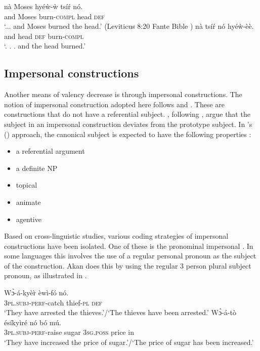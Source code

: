 \documentclass[output=paper]{langsci/langscibook}
\begin{document}
\ea\label{ex:34.osam}
\ea\label{ex:34a.osam}
\gll nà  Moses    hyéẁ-ẁ   tsíŕ  nó.\\
       and   Moses     burn-\textsc{compl}  head  \textsc{def}\\
\glt `...  and Moses burned the head.' (Leviticus 8:20 Fante Bible \citep{bible1974})
\ex\label{ex:34b.osam}
\gll  nà  tsíŕ   nó  hyéẁ-èè.\\
       and  head  \textsc{def}  burn-\textsc{compl}  \\
\glt `. .  . and the head burned.'
\z 
\z 


\subsection{Impersonal constructions}\label{§4.4:impersonal.osam}

Another means of valency decrease is through impersonal constructions. The notion of impersonal construction adopted here follows \citet{siewierska2008,siewierska2011} and \citet{malchukovogawa2011}. These are constructions that do not have a referential subject. \citet{malchukovogawa2011}, following \citet{keenan1976}, argue that the subject in an impersonal construction deviates from the prototype subject. In \citeauthor{keenan1976}'s (\citeyear{keenan1976}) approach, the canonical subject is expected to have the following properties \citep[23]{malchukovogawa2011}:

\begin{itemize}
 \item  a referential argument
 \item a definite NP
 \item topical
 \item animate
 \item  agentive
\end{itemize}


Based on cross-linguistic studies, various coding strategies of impersonal constructions have been isolated. One of these is the pronominal impersonal \citep{siewierska2011}. In some languages this involves the use of a regular personal pronoun as the subject of the construction. Akan does this by using the regular 3 person plural subject pronoun, as illustrated in .

\ea\label{ex:35.osam}
\ea\label{ex:35a.osam}
\gll  Wɔ̀-á-kyè\`{r}    èwì-fó    nó.\\
       \textsc{3pl.subj}-\textsc{perf}-catch  thief-\textsc{pl}  \textsc{def}\\
\glt `They have arrested the thieves.'/`The thieves have been arrested.'
\ex\label{ex:35b.osam}
\gll   Wɔ̀-á-tò    ésíkyìré  nó    bó  mú.\\
       \textsc{3pl.subj}-\textsc{perf}-raise  sugar    \textsc{3sg.poss}  price  in\\
\glt   `They have increased the price of sugar.'/`The price of sugar has been increased.'
\z 
\z 
\end{document}
